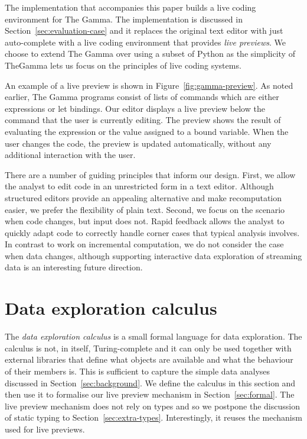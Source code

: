 \documentclass[english,submission]{programming}
\theoremstyle{plain}
\theoremstyle{definition}
\begin{document}
The implementation that accompanies this paper builds a live coding environment for The Gamma.
The implementation is discussed in Section~\ref{sec:evaluation-case} and it replaces
the original text editor with just auto-complete with a live coding environment
that provides \emph{live previews}. We choose to extend The Gamma over using a subset of Python
as the simplicity of TheGamma lets us focus on the principles of live coding systems.

An example of a live preview is shown in Figure~\ref{fig:gamma-preview}. As noted earlier, The
Gamma programs consist of lists of commands which are either expressions or let bindings. Our
editor displays a live preview below the command that the user is currently editing. The preview
shows the result of evaluating the expression or the value assigned to a bound variable. When the
user changes the code, the preview is updated automatically, without any additional interaction
with the user.

There are a number of guiding principles that inform our design. First, we allow the analyst
to edit code in an unrestricted form in a text editor. Although structured editors provide an
appealing alternative and make recomputation easier, we prefer the flexibility of plain text.
Second, we focus on the scenario when code changes, but input
does not. Rapid feedback allows the analyst to quickly adapt code to correctly handle
corner cases that typical analysis involves. In contrast to work on incremental computation,
we do not consider the case when data changes, although supporting interactive data exploration
of streaming data is an interesting future direction.


\section{Data exploration calculus}
\label{sec:calculus}

The \emph{data exploration calculus} is a small formal language for data exploration. The calculus
is not, in itself, Turing-complete and it can only be used together with external libraries that
define what objects are available and what the behaviour of their members is. This is
sufficient to capture the simple data analyses discussed in Section~\ref{sec:background}. We
define the calculus in this section and then use it to formalise our live preview
mechanism in Section~\ref{sec:formal}.
%
The live preview mechanism does not rely on types and so we postpone the discussion of static
typing to Section~\ref{sec:extra-types}. Interestingly, it reuses the mechanism used for live
previews.
\end{document}
